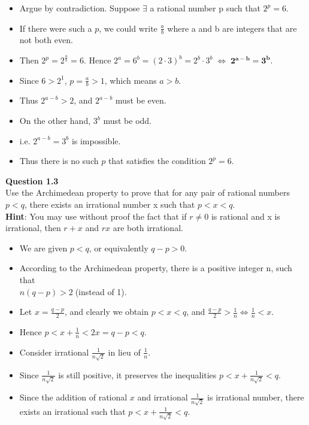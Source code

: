 \documentclass[12pt]{article}
\begin{document}
\begin{itemize}
    \item Argue by contradiction. Suppose $\exists$ a rational number p such that $2^p = 6$.
    \item If there were such a $p$, we could write $\frac{a}{b}$ where a and b are integers that are not both even.
    \item Then $2^p = 2^{\frac{a}{b}} = 6$. Hence $2^a = 6^b = (2\cdot 3)^b = 2^b \cdot 3^b \; \Leftrightarrow \; \mathbf{2^{a-b} = 3^b}.$
    \item Since $6 > 2^1$, $p=\frac{a}{b}>1$, which means $a > b$.
    \item Thus $2^{a-b} > 2$, and $2^{a-b}$ must be even.
    \item On the other hand, $3^b$ must be odd.
    \item i.e. $2^{a-b} = 3^b$ is impossible.
    \item Thus there is no such $p$ that satisfies the condition $2^p=6$.
\end{itemize}
\noindent \textbf{Question 1.3}\\
Use the Archimedean property to prove that for any pair of rational numbers $p < q$, there exists an irrational number x such that $p < x < q$.\\
\textbf{Hint}: You may use without proof the fact that if $r \neq 0$ is rational and x is irrational, then $r + x$ and $rx$ are both irrational.
\begin{itemize}
    \item We are given $p < q$, or equivalently $q - p > 0$. 
    \item According to the Archimedean property, there is a positive integer n, such that\\ $n(q - p) > 2\;$(instead of 1). 
    \item Let $x = \frac{q-p}{2}$, and clearly we obtain $p < x < q$, and $\frac{q-p}{2} > \frac{1}{n} \Leftrightarrow \frac{1}{n} < x$.
    \item Hence $p < x + \frac{1}{n} < 2x = q - p < q$.
    \item Consider irrational $\frac{1}{n\sqrt{2}}$ in lieu of $\frac{1}{n}$.
    \item Since $\frac{1}{n\sqrt{2}}$ is still positive, it preserves the inequalities $p < x + \frac{1}{n\sqrt{2}} < q$.
    \item Since the addition of rational $x$ and irrational $\frac{1}{n\sqrt{2}}$ is irrational number, there exists an irrational such that $p < x + \frac{1}{n\sqrt{2}} < q$.
\end{itemize}
\end{document}
